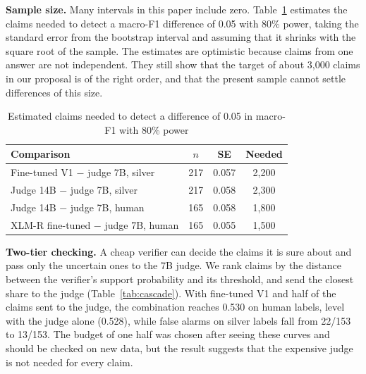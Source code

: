 \documentclass[conference]{IEEEtran}
\begin{document}
\textbf{Sample size.} Many intervals in this paper include zero. Table~\ref{tab:power} estimates the claims needed to detect a macro-F1 difference of 0.05 with 80\% power, taking the standard error from the bootstrap interval and assuming that it shrinks with the square root of the sample. The estimates are optimistic because claims from one answer are not independent. They still show that the target of about 3,000 claims in our proposal is of the right order, and that the present sample cannot settle differences of this size.

\begin{table}[t]
\caption{Estimated claims needed to detect a difference of 0.05 in macro-F1 with 80\% power}
\label{tab:power}
\centering
\footnotesize
\begin{tabular}{p{}ccc}
\toprule
Comparison & $n$ & SE & Needed \\
\midrule
Fine-tuned V1 $-$ judge 7B, silver & 217 & 0.057 & 2,200 \\
Judge 14B $-$ judge 7B, silver & 217 & 0.058 & 2,300 \\
Judge 14B $-$ judge 7B, human & 165 & 0.058 & 1,800 \\
XLM-R fine-tuned $-$ judge 7B, human & 165 & 0.055 & 1,500 \\
\bottomrule
\end{tabular}
\end{table}

\textbf{Two-tier checking.} A cheap verifier can decide the claims it is sure about and pass only the uncertain ones to the 7B judge. We rank claims by the distance between the verifier's support probability and its threshold, and send the closest share to the judge (Table~\ref{tab:cascade}). With fine-tuned V1 and half of the claims sent to the judge, the combination reaches 0.530 on human labels, level with the judge alone (0.528), while false alarms on silver labels fall from 22/153 to 13/153. The budget of one half was chosen after seeing these curves and should be checked on new data, but the result suggests that the expensive judge is not needed for every claim.
\end{document}
